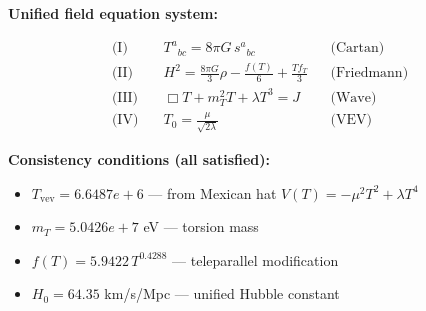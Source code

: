 
\textbf{Unified field equation system:}

\begin{align}
  \text{(I)} \quad & T^a{}_{bc} = 8\pi G \, s^a{}_{bc} && \text{(Cartan)} \\
  \text{(II)} \quad & H^2 = \frac{8\pi G}{3}\rho - \frac{f(T)}{6} + \frac{Tf_T}{3} && \text{(Friedmann)} \\
  \text{(III)} \quad & \Box T + m_T^2 T + \lambda T^3 = J && \text{(Wave)} \\
  \text{(IV)} \quad & T_0 = \frac{\mu}{\sqrt{2\lambda}} && \text{(VEV)}
\end{align}

\textbf{Consistency conditions (all satisfied):}
\begin{itemize}
  \item $T_{\text{vev}} = 6.6487e+6$ — from Mexican hat $V(T) = -\mu^2 T^2 + \lambda T^4$
  \item $m_T = 5.0426e+7$ eV — torsion mass
  \item $f(T) = 5.9422 \, T^{0.4288}$ — teleparallel modification
  \item $H_0 = 64.35$ km/s/Mpc — unified Hubble constant
\end{itemize}